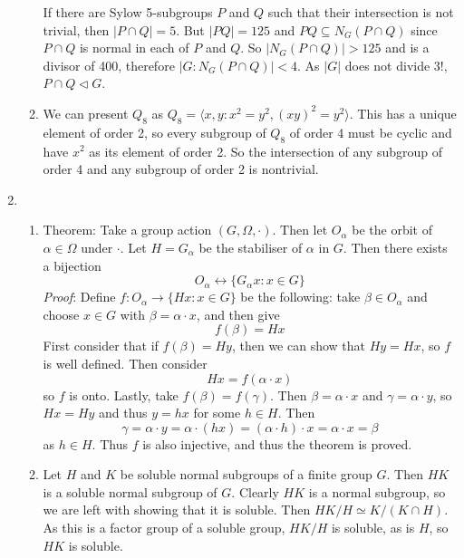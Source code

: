 \documentclass[]{article}
\begin{document}
\begin{enumerate}
\begin{enumerate}
			If there are Sylow 5-subgroups $P$ and $Q$ such that their intersection is not trivial, then $|P\cap Q|=5$. But $|PQ|=125$ and $PQ\subseteq N_G(P\cap Q)$ since $P\cap Q$ is normal in each of $P$ and $Q$. So $|N_G(P\cap Q)|>125$ and is a divisor of 400, therefore $|G:N_G(P\cap Q)|<4$. As $|G|$ does not divide $3!$, $P\cap Q\vartriangleleft G$.
			\item We can present $Q_8$ as $Q_8=\langle x,y:x^2=y^2,(xy)^2=y^2\rangle$. This has a unique element of order 2, so every subgroup of $Q_8$ of order 4 must be cyclic and have $x^2$ as its element of order 2. So the intersection of any subgroup of order 4 and any subgroup of order 2 is nontrivial.
		\end{enumerate}
		\item \begin{enumerate}
			\item Theorem: Take a group action $(G,\Omega, \cdot)$. Then let $O_\alpha$ be the orbit of $\alpha\in \Omega$ under $\cdot$. Let $H=G_\alpha$ be the stabiliser of $\alpha$ in $G$. Then there exists a bijection \[O_\alpha \leftrightarrow \{G_\alpha x:x\in G \} \] 
			\textit{Proof}: Define $f:O_\alpha \to \{Hx:x\in G \}$ be the following: take $\beta\in O_\alpha$ and choose $x\in G$ with $\beta =\alpha\cdot x$, and then give \[f(\beta)=Hx \] First consider that if $f(\beta)=Hy$, then we can show that $Hy=Hx$, so $f$ is well defined. Then consider \[Hx=f(\alpha\cdot x) \] so $f$ is onto. Lastly, take $f(\beta)=f(\gamma)$. Then $\beta = \alpha\cdot x $ and $\gamma=\alpha\cdot y$, so $Hx=Hy$ and thus $y=hx$ for some $h\in H$. Then \[\gamma=\alpha\cdot y=\alpha\cdot(hx)=(\alpha\cdot h)\cdot x=\alpha\cdot x=\beta \] as $h\in H$. Thus $f$ is also injective, and thus the theorem is proved.
			\item Let $H$ and $K$ be soluble normal subgroups of a finite group $G$. Then $HK$ is a soluble normal subgroup of $G$. Clearly $HK$ is a normal subgroup, so we are left with showing that it is soluble. Then $HK/H\simeq K/(K\cap H)$. As this is a factor group of a soluble group, $HK/H$ is soluble, as is $H$, so $HK$ is soluble.
			

\end{enumerate}
\end{enumerate}
\end{document}
